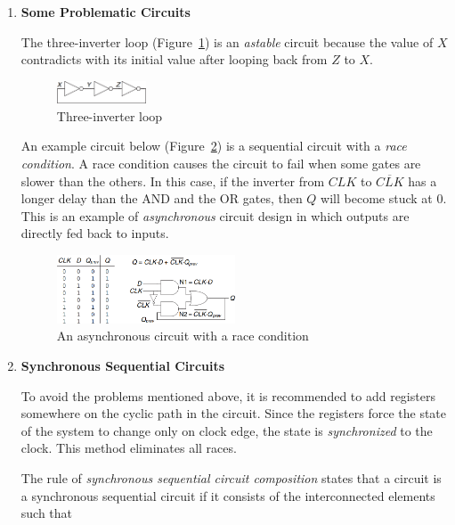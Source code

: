 \documentclass[12pt]{article}
\begin{document}
\begin{enumerate}
  \item \textbf{Some Problematic Circuits}

  The three-inverter loop (Figure~\ref{figure:10}) is an \textit{astable} circuit because the value of $X$ contradicts with its initial value after looping back from $Z$ to $X$.

  \begin{figure}[h]
    \centering
    \includegraphics[width=0.25\textwidth]{three_inverter_loop.png}
    \caption{Three-inverter loop}
    \label{figure:10}
  \end{figure}

  An example circuit below (Figure~\ref{figure:11}) is a sequential circuit with a \textit{race condition}. A race condition causes the circuit to fail when some gates are slower than the others. In this case, if the inverter from $CLK$ to $\overline{CLK}$ has a longer delay than the AND and the OR gates, then $Q$ will become stuck at 0. This is an example of \textit{asynchronous} circuit design in which outputs are directly fed back to inputs.

  \begin{figure}[h]
    \centering
    \includegraphics[width=0.5\textwidth]{race_condition_example.png}
    \caption{An asynchronous circuit with a race condition}
    \label{figure:11}
  \end{figure}

  \item \textbf{Synchronous Sequential Circuits}

  To avoid the problems mentioned above, it is recommended to add registers somewhere on the cyclic path in the circuit. Since the registers force the state of the system to change only on clock edge, the state is \textit{synchronized} to the clock. This method eliminates all races.

  The rule of \textit{synchronous sequential circuit composition} states that a circuit is a synchronous sequential circuit if it consists of the interconnected elements such that


\end{enumerate}
\end{document}

